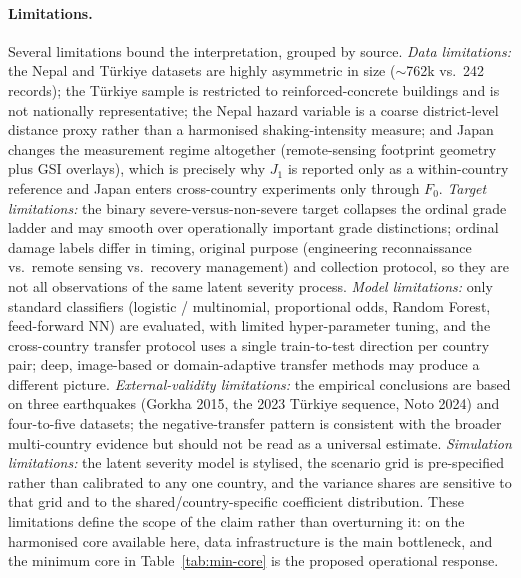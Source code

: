 \documentclass[11pt,a4paper]{article}
\begin{document}
\paragraph{Limitations.} Several limitations bound the interpretation, grouped by source.
\textit{Data limitations:} the Nepal and T\"urkiye datasets are highly asymmetric in size ($\sim$762k vs.\ 242 records); the T\"urkiye sample is restricted to reinforced-concrete buildings and is not nationally representative; the Nepal hazard variable is a coarse district-level distance proxy rather than a harmonised shaking-intensity measure; and Japan changes the measurement regime altogether (remote-sensing footprint geometry plus GSI overlays), which is precisely why $J_1$ is reported only as a within-country reference and Japan enters cross-country experiments only through $F_0$.
\textit{Target limitations:} the binary severe-versus-non-severe target collapses the ordinal grade ladder and may smooth over operationally important grade distinctions; ordinal damage labels differ in timing, original purpose (engineering reconnaissance vs.\ remote sensing vs.\ recovery management) and collection protocol, so they are not all observations of the same latent severity process.
\textit{Model limitations:} only standard classifiers (logistic / multinomial, proportional odds, Random Forest, feed-forward NN) are evaluated, with limited hyper-parameter tuning, and the cross-country transfer protocol uses a single train-to-test direction per country pair; deep, image-based or domain-adaptive transfer methods may produce a different picture.
\textit{External-validity limitations:} the empirical conclusions are based on three earthquakes (Gorkha 2015, the 2023 T\"urkiye sequence, Noto 2024) and four-to-five datasets; the negative-transfer pattern is consistent with the broader multi-country evidence \citep{ghimire2024host} but should not be read as a universal estimate.
\textit{Simulation limitations:} the latent severity model is stylised, the scenario grid is pre-specified rather than calibrated to any one country, and the variance shares are sensitive to that grid and to the shared/country-specific coefficient distribution.
These limitations define the scope of the claim rather than overturning it: on the harmonised core available here, data infrastructure is the main bottleneck, and the minimum core in Table~\ref{tab:min-core} is the proposed operational response.
\end{document}
